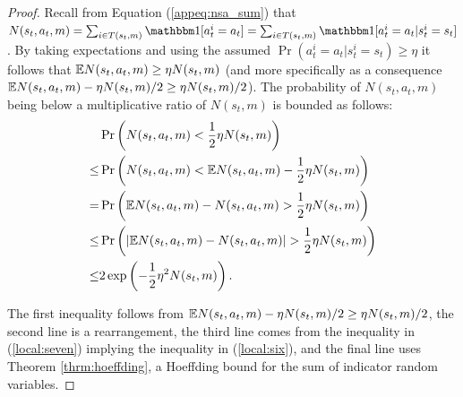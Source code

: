         \begin{proof}
            Recall from Equation (\ref{appeq:nsa_sum}) that $N(s_t,a_t,m)=\sum_{i\in T(s_t,m)} \one[a^i_t=a_t] = \sum_{i\in T(s_t,m)} \one[a^i_t=a_t | s^i_t=s_t]$. By taking expectations and using the assumed $\Pr(a^i_t=a_t|s^i_t=s_t)\geq\eta$ it follows that $\mathbb{E}N(s_t,a_t,m) \geq \eta N(s_t,m)$ (and more specifically as a consequence $\mathbb{E}N(s_t,a_t,m) - \eta N(s_t,m)/2 \geq \eta N(s_t,m)/2$). The probability of $N(s_t,a_t,m)$ being below a multiplicative ratio of $N(s_t,m)$ is bounded as follows:
            \begin{align}
                & \Pr\left(N(s_t,a_t,m) < \frac{1}{2}\eta N(s_t,m)\right) \\
                    \leq & \Pr\left(N(s_t,a_t,m) < \mathbb{E}N(s_t,a_t,m) - \frac{1}{2}\eta N(s_t,m)\right) \\
                    = & \Pr\left(\mathbb{E}N(s_t,a_t,m) - N(s_t,a_t,m) > \frac{1}{2}\eta N(s_t,m)\right) 
                        \label{local:seven} \\
                    \leq & \Pr\left(|\mathbb{E}N(s_t,a_t,m) - N(s_t,a_t,m)| > \frac{1}{2}\eta N(s_t,m)\right) 
                        \label{local:six} \\
                    \leq & 2\exp\left(-\frac{1}{2}\eta^2N(s_t,m)\right). \label{eq:bound_nsa}
            \end{align}
            
            The first inequality follows from $\mathbb{E}N(s_t,a_t,m) - \eta N(s_t,m)/2 \geq \eta N(s_t,m)/2$, the second line is a rearrangement, the third line comes from the inequality in (\ref{local:seven}) implying the inequality in (\ref{local:six}), and the final line uses Theorem \ref{thrm:hoeffding}, a Hoeffding bound for the sum of indicator random variables. 
            

\end{proof}
